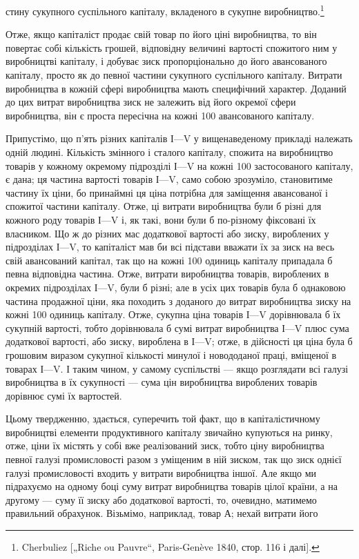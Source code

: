 стину сукупного суспільного капіталу, вкладеного в сукупне
виробництво.\footnote{
Cherbuliez [„Riche ou Pauvre“, Paris-Genève 1840, стор. 116 і далі].
}

Отже, якщо капіталіст продає свій товар по його ціні виробництва, то він повертає собі кількість
грошей, відповідну величині вартості спожитого ним у виробництві капіталу, і добуває зиск
пропорціонально до його авансованого капіталу, просто
як до певної частини сукупного суспільного капіталу. Витрати
виробництва в кожній сфері виробництва мають специфічний
характер. Доданий до цих витрат виробництва зиск не залежить від його окремої сфери виробництва, він
є проста пересічна
на кожні 100 авансованого капіталу.

Припустімо, що п’ять різних капіталів І—V у вищенаведеному прикладі належать одній людині. Кількість
змінного і сталого капіталу, спожита на виробництво товарів у кожному окремому підрозділі І—V на
кожні 100 застосованого капіталу,
є дана; ця частина вартості товарів І—V, само собою зрозуміло, становитиме частину їх ціни, бо
принаймні ця ціна потрібна для заміщення авансованої і спожитої частини капіталу. Отже, ці витрати
виробництва були б різні для кожного роду
товарів І—V і, як такі, вони були б по-різному фіксовані їх власником. Що ж до різних мас додаткової
вартості або зиску, вироблених у підрозділах І—V, то капіталіст мав би всі підстави вважати їх за
зиск на весь свій авансований капітал, так що
на кожні 100 одиниць капіталу припадала б певна відповідна
частина. Отже, витрати виробництва товарів, вироблених в окремих підрозділах І—V, були б різні; але
в усіх цих товарів
була б однаковою частина продажної ціни, яка походить з доданого до витрат виробництва зиску на
кожні 100 одиниць капіталу. Отже, сукупна ціна товарів І—V дорівнювала б їх сукупній вартості, тобто
дорівнювала б сумі витрат виробництва
І—V плюс сума додаткової вартості, або зиску, вироблена в
І—V; отже, в дійсності ця ціна була б грошовим виразом сукупної кількості минулої і новододаної
праці, вміщеної в товарах
І—V. І таким чином, у самому суспільстві — якщо розглядати
всі галузі виробництва в їх сукупності — сума цін виробництва
вироблених товарів дорівнює сумі їх вартостей.

Цьому твердженню, здається, суперечить той факт, що в
капіталістичному виробництві елементи продуктивного капіталу
звичайно купуються на ринку, отже, ціни їх містять у собі вже
реалізований зиск, тобто ціну виробництва певної галузі промисловості разом з уміщеним в ній зиском,
так що зиск однієї
галузі промисловості входить у витрати виробництва іншої.
Але якщо ми підрахуємо на одному боці суму витрат виробництва товарів цілої країни, а на другому —
суму її зиску або додаткової вартості, то, очевидно, матимемо правильний обрахунок. Візьмімо,
наприклад, товар А; нехай витрати його